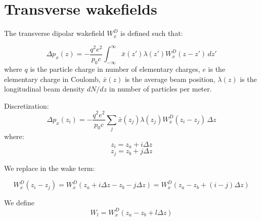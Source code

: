 \section{Transverse wakefields}

The transverse dipolar wakefield $W^D_{x}$ is defined such that:

\begin{equation}
\Delta p_x(z) = -\frac{q^2 e^2}{p_0c}\int_{-\infty}^\infty 
    \bar{x}(z')\lambda(z')W^D_{x}(z-z') \, dz'
\end{equation}
where $q$ is the particle charge in number of elementary charges, $e$ is the elementary charge in Coulomb, $\bar{x}(z)$ is the average beam position, $\lambda(z)$ is the longitudinal beam density $dN/dz$ in number of particles per meter.

Discretization:
\begin{equation}
\Delta p_x(z_i) = -\frac{q^2 e^2}{p_0c}
    \sum_j
    \bar{x}(z_j)\lambda(z_j)W^D_{x}(z_i-z_j) \, \Delta z
\end{equation}
where:
\begin{equation}
z_i = z_a + i\Delta z
\end{equation}
\begin{equation}
z_j = z_b + j\Delta z
\end{equation}

We replace in the wake term:


\begin{equation}
 W^D_{x}(z_i-z_j)  = 
  W^D_{x}(z_a + i\Delta z-z_b - j\Delta z)
 = W^D_{x}(z_a -z_b + (i - j) \Delta z)
\end{equation}

We define
\begin{equation}
W_{l} = W^D_{x}(z_a -z_b + l \Delta z) 
\end{equation}
